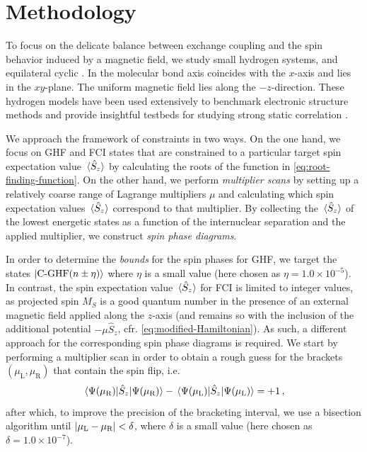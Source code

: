 \documentclass[journal=jctc,manuscript=article]{achemso}
\begin{document}
\section{Methodology} \label{sec:methodology}

    To focus on the delicate balance between exchange coupling and the spin behavior induced by a magnetic field, we study small hydrogen systems,  and equilateral cyclic . In  the molecular bond axis coincides with the $x$-axis and  lies in the $xy$-plane. The  uniform magnetic field lies along the $-z$-direction. These hydrogen models have been used extensively to benchmark electronic structure methods and provide insightful testbeds for studying strong static correlation \cite{burton2016a, mori2014a, jankowski1980a, bulik2015a, burton2020a, DeVriendt.2021}. 

    We approach the framework of constraints in two ways.
    On the one hand, we focus on GHF and FCI states that are constrained to a particular target spin expectation value $\ev*{\hat{S}_z}$ by calculating the roots of the function in \cref{eq:root-finding-function}.
    On the other hand, we perform \emph{multiplier scans} by setting up a relatively coarse range of Lagrange multipliers $\mu$ and calculating which spin expectation values $\ev*{\hat{S}_z}$ correspond to that multiplier.
    By collecting the $\ev*{\hat{S}_z}$ of the lowest energetic states as a function of the internuclear separation and the applied multiplier, we construct \emph{spin phase diagrams}.

    In order to determine the \emph{bounds} for the spin phases for GHF, we target the states $\ket{\text{C-GHF}(n \pm \eta)}$ where $\eta$ is a small value (here chosen as $\eta = 1.0 \times 10^{-5}$).
    In contrast, the spin expectation value $\ev*{\hat{S}_z}$ for FCI is limited to integer values, as projected spin $M_S$ is a good quantum number in the presence of an external magnetic field applied along the $z$-axis (and remains so with the inclusion of the additional potential $-\mu \hat{S}_z$, cfr. \cref{eq:modified-Hamiltonian}). 
    As such, a different approach for the corresponding spin phase diagrams is required.
    We start by performing a multiplier scan in order to obtain a rough guess for the brackets $(\mu_{\text{L}}, \mu_{\text{R}})$ that contain the spin flip, i.e.
    \begin{equation}
        \ev*{\hat{S}_z}{\Psi(\mu_{\text{R}})} - \ev*{\hat{S}_z}{\Psi(\mu_{\text{L}})} = +1
        \thinspace ,
    \end{equation}
    after which, to improve the precision of the bracketing interval, we use a bisection algorithm until $\abs{\mu_{\text{L}} - \mu_{\text{R}}} < \delta$, where $\delta$ is a small value (here chosen as $\delta = 1.0 \times 10^{-7}$).
\end{document}
